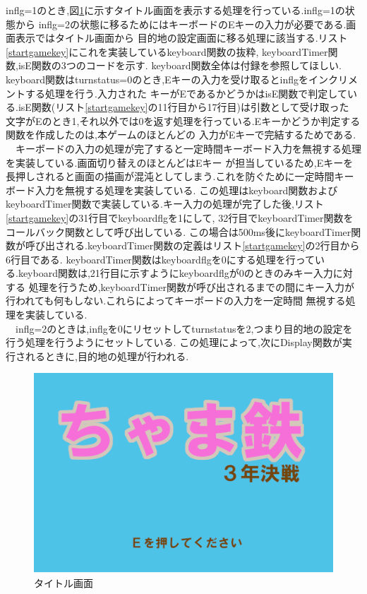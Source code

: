 \documentclass[a4j]{jarticle}
\begin{document}
    inflg=1のとき,図\ref{title}に示すタイトル画面を表示する処理を行っている.inflg=1の状態から
    inflg=2の状態に移るためにはキーボードのEキーの入力が必要である.画面表示ではタイトル画面から
    目的地の設定画面に移る処理に該当する.リスト\ref{startgamekey}にこれを実装しているkeyboard関数の抜粋,
    keyboardTimer関数,isE関数の3つのコードを示す. keyboard関数全体は付録を参照してほしい.
    keyboard関数はturnstatus=0のとき,Eキーの入力を受け取るとinflgをインクリメントする処理を行う.入力された
    キーがEであるかどうかはisE関数で判定している.isE関数(リスト\ref{startgamekey}の11行目から17行目)は引数として受け取った
    文字がEのとき1,それ以外では0を返す処理を行っている.Eキーかどうか判定する関数を作成したのは,本ゲームのほとんどの
    入力がEキーで完結するためである.\\
    　キーボードの入力の処理が完了すると一定時間キーボード入力を無視する処理を実装している.画面切り替えのほとんどはEキー
    が担当しているため,Eキーを長押しされると画面の描画が混沌としてしまう.これを防ぐために一定時間キーボード入力を無視する処理を実装している.
    この処理はkeyboard関数およびkeyboardTimer関数で実装している.キー入力の処理が完了した後,リスト\ref{startgamekey}の31行目でkeyboardflgを1にして,
    32行目でkeyboardTimer関数をコールバック関数として呼び出している.
    この場合は500ms後にkeyboardTimer関数が呼び出される.keyboardTimer関数の定義はリスト\ref{startgamekey}の2行目から6行目である.
    keyboardTimer関数はkeyboardflgを0にする処理を行っている.keyboard関数は,21行目に示すようにkeyboardflgが0のときのみキー入力に対する
    処理を行うため,keyboardTimer関数が呼び出されるまでの間にキー入力が行われても何もしない.これらによってキーボードの入力を一定時間
    無視する処理を実装している.\\
    　inflg=2のときは,inflgを0にリセットしてturnstatusを2,つまり目的地の設定を行う処理を行うようにセットしている.
    この処理によって,次にDisplay関数が実行されるときに,目的地の処理が行われる.

    \begin{figure}[H]
        \centering
        \includegraphics[scale=1.7]{sp4.png}
        \caption{タイトル画面}
         \label{title}
        \end{figure}   
    
\end{document}

